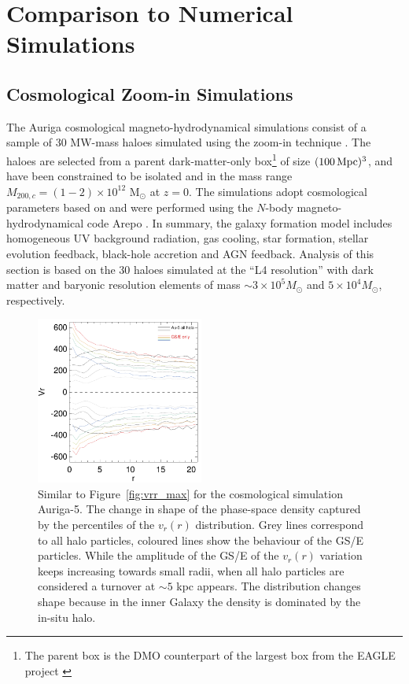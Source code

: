 \documentclass[a4paper,useAMS,usenatbib]{mnras}
\begin{document}
\section{Comparison to Numerical Simulations}
\label{sec:sims}

\subsection{Cosmological Zoom-in Simulations}
\label{sec:cosmo}

The Auriga cosmological magneto-hydrodynamical simulations \citep{Grand2017} consist of a sample of 30 MW-mass haloes simulated using the zoom-in technique \citep{Jenkins2013}. The haloes are selected from a parent dark-matter-only box\footnote{The parent box is the DMO counterpart of the largest box from the EAGLE project \citep{Schaye2015}} of size $(100\,{\rm Mpc})^3$, and have been constrained to be isolated and in the mass range $M_{200,c}=(1-2)\times10^{12}$ M$_{\odot}$ at $z=0$.
The simulations adopt cosmological parameters based on \citet{Planck2014} and were performed using the $N$-body magneto-hydrodynamical code Arepo \citep{springel2010}. In summary, the galaxy formation model includes homogeneous UV background radiation, gas cooling, star formation, stellar evolution feedback, black-hole accretion and AGN feedback. Analysis of this section is based on the 30 haloes simulated at the ``L4 resolution'' with dark matter and baryonic resolution elements of mass $\sim 3\times 10^5 M_{\odot}$ and $5\times10^4 M_{\odot}$, respectively. 

%
\begin{figure}
  \centering
  \includegraphics[width=0.49\textwidth]{img/Auriga_5_maxvr_r.pdf}
  \caption[]{Similar to Figure~\ref{fig:vrr_max} for the cosmological simulation Auriga-5. The change in shape of the phase-space density captured by the percentiles of the $v_r(r)$ distribution. Grey lines correspond to all halo particles, coloured lines show the behaviour of the GS/E particles. While the amplitude of the GS/E of the $v_r(r)$ variation keeps increasing towards small radii, when all halo particles are considered a turnover at $\sim5$ kpc appears. The distribution changes shape because in the inner Galaxy the density is dominated by the in-situ halo.}
   \label{fig:Auriga_vrr_max}
\end{figure}
%
\end{document}
